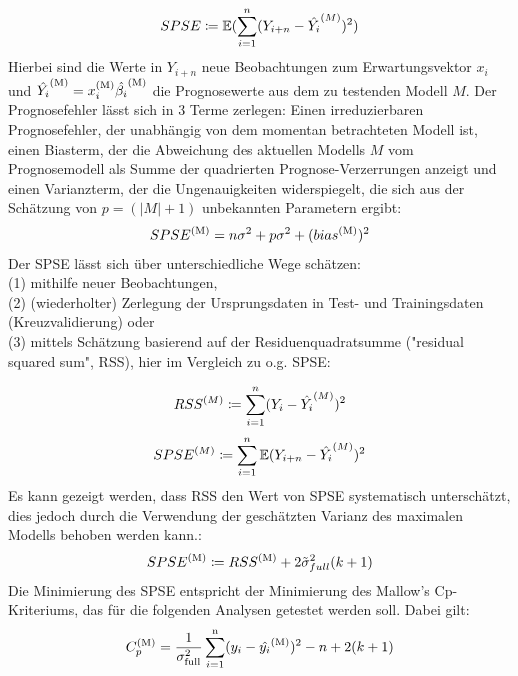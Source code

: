 	\begin{align*}
		SPSE \coloneqq \operatorname{\mathbb{E}}(\sum_{i=1}^{n} (Y_{i+n} - \hat{Y_i}^{(M)})^2)
	\end{align*}
	Hierbei sind die Werte in $Y_{i+n}$ neue Beobachtungen zum Erwartungsvektor $x_i$ und $\hat{Y_i}^{\mathrm{(M)}}  = x_{i}^{\mathrm{(M)}}\hat{\beta_i}^{\mathrm{(M)}}$ die Prognosewerte aus dem zu testenden Modell $M$.
	Der Prognosefehler lässt sich in 3 Terme zerlegen: Einen irreduzierbaren Prognosefehler, der unabhängig von dem momentan betrachteten Modell ist, einen Biasterm, der die Abweichung des aktuellen Modells $M$ vom Prognosemodell als Summe der quadrierten Prognose-Verzerrungen anzeigt und einen Varianzterm, der die Ungenauigkeiten widerspiegelt, die sich aus der Schätzung von $p = (|M|+1)$ unbekannten Parametern ergibt:
	\begin{align*}
		SPSE^{\mathrm{(M)}} = n\sigma^2 + p\sigma^2 + (bias^{\mathrm{(M)}})^2
	\end{align*}
	Der SPSE lässt sich über unterschiedliche Wege schätzen: \\(1) mithilfe neuer Beobachtungen, \\(2) (wiederholter) Zerlegung der Ursprungsdaten in Test- und Trainingsdaten (Kreuzvalidierung)  oder \\(3) mittels Schätzung basierend auf der Residuenquadratsumme ("residual squared sum", RSS), hier im Vergleich zu o.g. SPSE:

	\begin{align*}
	RSS^{(M)} \coloneqq \sum_{i=1}^{n} (Y_{i} - \hat{Y_i}^{(M)})^2
	\end{align*}
	\begin{align*}
	SPSE^{(M)} \coloneqq \sum_{i=1}^{n} \operatorname{\mathbb{E}} (Y_{i+n} - \hat{Y_i}^{(M)})^2
	\end{align*}
	Es kann gezeigt werden, dass RSS den Wert von SPSE systematisch unterschätzt, dies jedoch durch die Verwendung der geschätzten Varianz des maximalen Modells behoben werden kann.\cite{Schumacher.2019}:
	\begin{align*}
	SPSE^{\mathrm{(M)}} \coloneqq RSS^{\mathrm{(M)}} + 2 \tilde{\sigma}_{full} ^2 (k+1)
	\end{align*}
	Die Minimierung des SPSE entspricht der Minimierung des Mallow's Cp- Kriteriums, das für die folgenden Analysen getestet werden soll. Dabei gilt:
	\begin{align*}
	C^{\mathrm{(M)}}_p = \frac{1}{\sigma_{\mathrm{full}}^2} \sum_{i=1}^{\mathrm{n}} (y_i - \hat{y_i}^{\mathrm{(M)}})^2 - n + 2(k+1)
	\end{align*}

